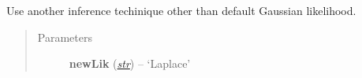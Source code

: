 \documentclass[letterpaper,10pt,english]{sphinxmanual}
\begin{document}
\begin{fulllineitems}
\begin{fulllineitems}
\begin{quote}
\begin{description}
\end{description}\end{quote}

\end{fulllineitems}


\begin{fulllineitems}
\label{pyGPs.Core:pyGPs.Core.gp.GPR_FITC.useLikelihood}
Use another inference techinique other than default Gaussian likelihood.
\begin{quote}\begin{description}
\item[{Parameters}] \leavevmode
\textbf{newLik} (\href{http://docs.python.org/library/functions.html\#str}{\emph{str}}) -- `Laplace'

\end{description}\end{quote}

\end{fulllineitems}


\end{fulllineitems}

\end{document}
